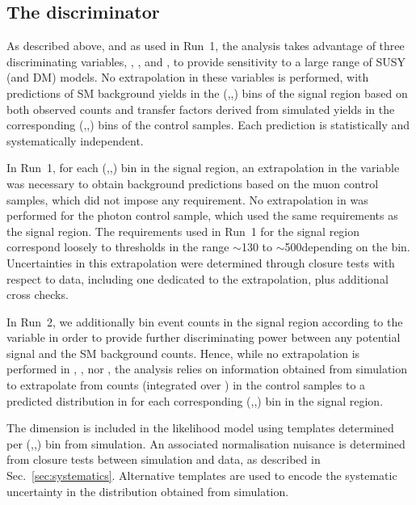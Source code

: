 \subsection{The \texorpdfstring{\mht}{MHT} discriminator }

As described above, and as used in Run~1, the analysis takes advantage of three discriminating variables, \njet, \nb, and \HT, to provide
sensitivity to a large range of SUSY (and DM) models. No extrapolation in these variables is performed, with predictions of SM background
yields in the (\njet,\nb,\HT) bins of the signal region based on both observed counts and transfer factors derived from simulated yields in
the corresponding (\njet,\nb,\HT) bins of the control samples. Each prediction is statistically and systematically independent.

In Run~1, for each (\njet,\nb,\HT) bin in the signal region, an extrapolation in the variable \alphat was necessary to obtain
background predictions based on the muon control samples, which did not impose any \alphat requirement. No extrapolation in \alphat was
performed for the photon control sample, which used the same \alphat requirements as the signal region. The \alphat requirements used in
Run~1 for the signal region correspond loosely to \mht thresholds in the range $\sim$130 to $\sim$500\gev depending on the \HT
bin. Uncertainties in this extrapolation were determined through closure tests with respect to data, including one dedicated to the
\alphat extrapolation, plus additional cross checks.

In Run~2, we additionally bin event counts in the signal region according to the variable \mht in order to provide further
discriminating power between any potential signal and the SM background counts. Hence, while no extrapolation is performed in
\njet, \nb, nor \HT, the analysis relies on information obtained from simulation to extrapolate from counts (integrated over \mht) in
the control samples to a predicted distribution in \mht for each corresponding (\njet,\nb,\HT) bin in the signal region.

The \mht dimension is included in the likelihood model using templates determined per (\njet,\nb,\HT) bin from simulation. An associated
normalisation nuisance is determined from closure tests between simulation and data, as described in
Sec.~\ref{sec:systematics}. Alternative templates are used to encode the systematic uncertainty in the \mht distribution obtained from
simulation. 

